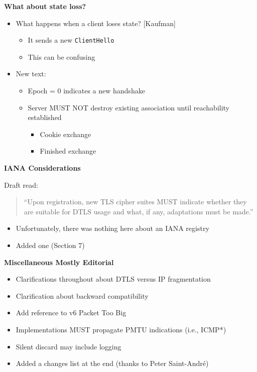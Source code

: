 \documentclass[helvetica]{seminar}
\newcommand{\heading}[1]{%
  \begin{center} 
    \large\bf 
    #1 
  \end{center} 
  \vspace{.4 in}}
\begin{document}
\begin{slide}
\heading{What about state loss?}

\begin{itemize}
\item What happens when a client loses state? [Kaufman]
  \begin{itemize}
  \item It sends a new \verb^ClientHello^ 
  \item This can be confusing
  \end{itemize}

\item New text:
  \begin{itemize}
  \item Epoch = 0 indicates a new handshake
  \item Server MUST NOT destroy existing association until reachability established
    \begin{itemize}
    \item Cookie exchange
    \item Finished exchange
    \end{itemize}
  \end{itemize}

\end{itemize}
\end{slide}



\begin{slide}
\heading{IANA Considerations}

Draft read:

\begin{quote}
``Upon registration, new TLS cipher suites MUST indicate whether they
are suitable for DTLS usage and what, if any, adaptations must be made.''
\end{quote}

\begin{itemize}
\item Unfortunately, there was nothing here about an IANA registry
\item Added one (Section 7)
\end{itemize}

\end{slide}



\begin{slide}
\heading{Miscellaneous Mostly Editorial}

\begin{itemize}
\item Clarifications throughout about DTLS versus IP fragmentation
\item Clarification about backward compatibility
\item Add reference to v6 Packet Too Big
\item Implementations MUST propagate PMTU indications (i.e., ICMP*)
\item Silent discard may include logging
\item Added a changes list at the end (thanks to Peter Saint-Andr\'e)
\end{itemize}
\end{slide}
\end{document}
